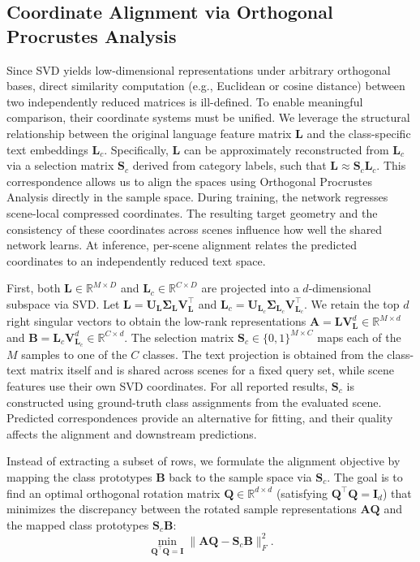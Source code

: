 \subsection{Coordinate Alignment via Orthogonal Procrustes Analysis}
\label{subsec:OPA}
Since SVD yields low-dimensional representations under arbitrary orthogonal bases, direct similarity computation (e.g., Euclidean or cosine distance) between two independently reduced matrices is ill-defined. To enable meaningful comparison, their coordinate systems must be unified. We leverage the structural relationship between the original language feature matrix $\mathbf{L}$ and the class-specific text embeddings $\mathbf{L}_c$. Specifically, $\mathbf{L}$ can be approximately reconstructed from $\mathbf{L}_c$ via a selection matrix $\mathbf{S}_c$ derived from category labels, such that $\mathbf{L} \approx \mathbf{S}_c \mathbf{L}_c$. This correspondence allows us to align the spaces using Orthogonal Procrustes Analysis directly in the sample space. During training, the network regresses scene-local compressed coordinates. The resulting target geometry and the consistency of these coordinates across scenes influence how well the shared network learns. At inference, per-scene alignment relates the predicted coordinates to an independently reduced text space.

First, both $\mathbf{L} \in \mathbb{R}^{M \times D}$ and $\mathbf{L}_c \in \mathbb{R}^{C \times D}$ are projected into a $d$-dimensional subspace via SVD. Let $\mathbf{L} = \mathbf{U}_\mathbf{L} \mathbf{\Sigma}_\mathbf{L} \mathbf{V}_{\mathbf{L}}^\top$ and $\mathbf{L}_c = \mathbf{U}_{\mathbf{L}_c} \mathbf{\Sigma}_{\mathbf{L}_c} \mathbf{V}_{\mathbf{L}_c}^\top$. We retain the top $d$ right singular vectors to obtain the low-rank representations $\mathbf{A} = \mathbf{L} \mathbf{V}_{\mathbf{L}}^d \in \mathbb{R}^{M \times d}$ and $\mathbf{B} = \mathbf{L}_c \mathbf{V}_{\mathbf{L}_c}^d \in \mathbb{R}^{C \times d}$. The selection matrix $\mathbf{S}_c \in \{0,1\}^{M \times C}$ maps each of the $M$ samples to one of the $C$ classes. The text projection is obtained from the class-text matrix itself and is shared across scenes for a fixed query set, while scene features use their own SVD coordinates. For all reported results, $\mathbf{S}_c$ is constructed using ground-truth class assignments from the evaluated scene. Predicted correspondences provide an alternative for fitting, and their quality affects the alignment and downstream predictions. 

Instead of extracting a subset of rows, we formulate the alignment objective by mapping the class prototypes $\mathbf{B}$ back to the sample space via $\mathbf{S}_c$. The goal is to find an optimal orthogonal rotation matrix $\mathbf{Q} \in \mathbb{R}^{d \times d}$ (satisfying $\mathbf{Q}^\top \mathbf{Q} = \mathbf{I}_d$) that minimizes the discrepancy between the rotated sample representations $\mathbf{A}\mathbf{Q}$ and the mapped class prototypes $\mathbf{S}_c \mathbf{B}$:
\begin{equation}
    \min_{\mathbf{Q}^\top \mathbf{Q} = \mathbf{I}} \| \mathbf{A} \mathbf{Q} - \mathbf{S}_c \mathbf{B} \|_F^2.
    \label{eq:procrustes_sample_space}
\end{equation}

